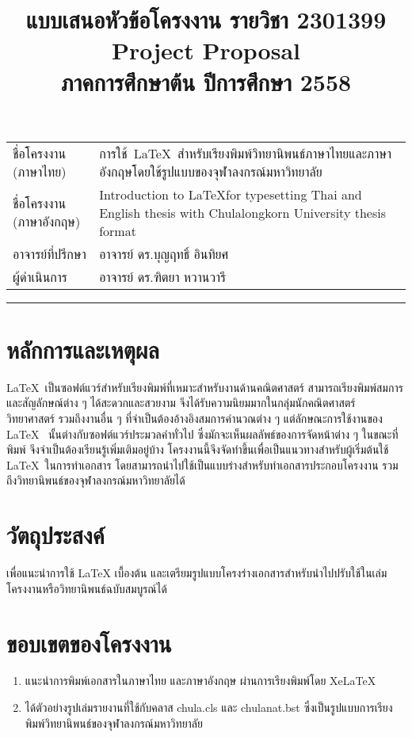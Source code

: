 \documentclass[tikz]{standalone}
\begin{document}
\title{แบบเสนอหัวข้อโครงงาน รายวิชา 2301399 \\ Project Proposal \\ ภาคการศึกษาต้น ปีการศึกษา 2558}

\makeatletter
\begin{center}
    {\Large \@title \par}
\end{center}
\makeatother

\begin{tabular}{p{4.5cm}p{9cm}}
ชื่อโครงงาน (ภาษาไทย) & การใช้~\LaTeX ~สำหรับเรียงพิมพ์วิทยานิพนธ์ภาษาไทยและภาษาอังกฤษโดยใช้รูปแบบของจุฬาลงกรณ์มหาวิทยาลัย \\
ชื่อโครงงาน (ภาษาอังกฤษ)	& Introduction to \LaTeX for typesetting Thai and English thesis with Chulalongkorn University thesis format \\
อาจารย์ที่ปรึกษา & อาจารย์ ดร.บุญฤทธิ์ อินทิยศ \\
ผู้ดำเนินการ	& อาจารย์ ดร.ฑิตยา หวานวารี \\
\end{tabular}
    \vspace*{0.4cm}
    \hrule width 15 cm height 0.0 cm depth 0.025 cm

\section{หลักการและเหตุผล}
\LaTeX~เป็นซอฟต์แวร์สำหรับเรียงพิมพ์ที่เหมาะสำหรับงานด้านคณิตศาสตร์ สามารถเรียงพิมพ์สมการและสัญลักษณ์ต่าง ๆ ได้สะดวกและสวยงาม จึงได้รับความนิยมมากในกลุ่มนักคณิตศาสตร์ วิทยาศาสตร์ รวมถึงงานอื่น ๆ ที่จำเป็นต้องอ้างอิงสมการคำนวณต่าง ๆ แต่ลักษณะการใช้งานของ \LaTeX~ นั้นต่างกับซอฟต์แวร์ประมวลคำทั่วไป ซึ่งมักจะเห็นผลลัพธ์ของการจัดหน้าต่าง ๆ ในขณะที่พิมพ์ จึงจำเป็นต้องเรียนรู้เพิ่มเติมอยู่บ้าง โครงงานนี้จึงจัดทำขึ้นเพื่อเป็นแนวทางสำหรับผู้เริ่มต้นใช้ \LaTeX~ในการทำเอกสาร โดยสามารถนำไปใช้เป็นแบบร่างสำหรับทำเอกสารประกอบโครงงาน รวมถึงวิทยานิพนธ์ของจุฬาลงกรณ์มหาวิทยาลัยได้
\section{วัตถุประสงค์}
เพื่อแนะนำการใช้ {\rmfamily \LaTeX} เบื้องต้น และเตรียมรูปแบบโครงร่างเอกสารสำหรับนำไปปรับใช้ในเล่มโครงงานหรือวิทยานิพนธ์ฉบับสมบูรณ์ได้
\section{ขอบเขตของโครงงาน}
\begin{enumerate}
    \item แนะนำการพิมพ์เอกสารในภาษาไทย และภาษาอังกฤษ ผ่านการเรียงพิมพ์โดย {\rmfamily Xe\LaTeX}
    \item ได้ตัวอย่างรูปเล่มรายงานที่ใช้กับคลาส chula.cls และ chulanat.bst ซึ่งเป็นรูปแบบการเรียงพิมพ์วิทยานิพนธ์ของจุฬาลงกรณ์มหาวิทยาลัย
\end{enumerate}
\end{document}
